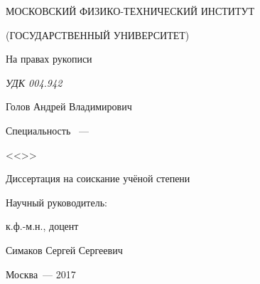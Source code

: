 \thispagestyle{empty}

\begin{center}

МОСКОВСКИЙ ФИЗИКО-ТЕХНИЧЕСКИЙ ИНСТИТУТ

 (ГОСУДАРСТВЕННЫЙ УНИВЕРСИТЕТ) \par
\par
\end{center}

\vspace{20mm}
\begin{flushright}
На правах рукописи

{\sl УДК  004.942   }%
\end{flushright}

\vspace{30mm}
\begin{center}
{\large Голов Андрей Владимирович}
\end{center}

\vspace{5mm}
\begin{center}
{\bf \large \thesisTitle
\par}

\vspace{10mm}
{%
Специальность \thesisSpecialtyNumber~---

<<\thesisSpecialtyTitle>>
}

\vspace{10mm}
Диссертация на соискание учёной степени

\thesisDegree
\end{center}

\vspace{20mm}
\begin{flushright}
Научный руководитель:

к.ф.-м.н., доцент

Симаков Сергей Сергеевич

\end{flushright}

\vspace{15mm}
\begin{center}
{Москва~--- 2017}
\end{center}

\newpage
